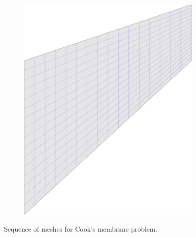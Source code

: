 \documentclass{article}
\begin{document}
\begin{figure}[htb!]
\begin{subfigure}[b]{0.18\linewidth}
        \includegraphics[width=\linewidth]{mesh_cook_4}
    \end{subfigure}
    \caption{Sequence of meshes for Cook's membrane problem.}
    \label{fig:mesh_cook}
\end{figure}
\end{document}
